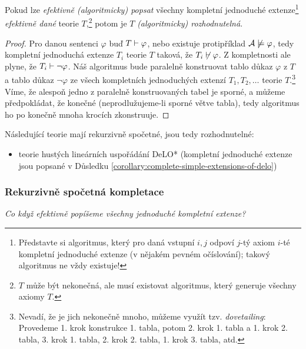 \begin{proposition}\label{propositon:efficient-complete-simple}    
    Pokud lze \emph{efektivně (algoritmicky) popsat} všechny kompletní jednoduché extenze\footnote{Představte si algoritmus, který pro daná vstupní $i,j$ odpoví $j$-tý axiom $i$-té kompletní jednoduché extenze (v nějakém pevném očíslování); takový algoritmus ne vždy existuje!} \emph{efektivně dané} teorie $T$,\footnote{$T$ může být nekonečná, ale musí existovat algoritmus, který generuje všechny axiomy $T$.} potom je $T$ \emph{(algoritmicky) rozhodnutelná}.
\end{proposition}
\begin{proof}
Pro danou sentenci $\varphi$ buď $T\vdash\varphi$, nebo existuje protipříklad $\mathcal{A}\not\models\varphi$, tedy kompletní jednoduchá extenze $T_i$ teorie $T$ taková, že $T_i\not\vdash\varphi$. Z kompletnosti ale plyne, že $T_i\vdash\neg\varphi$. Náš algoritmus bude paralelně konstruovat tablo důkaz $\varphi$ z $T$ a tablo důkaz $\neg\varphi$ ze všech kompletních jednoduchých extenzí $T_1,T_2,\dots$ teorie $T$.\footnote{Nevadí, že je jich nekonečně mnoho, můžeme využít tzv. \emph{dovetailing}: Provedeme 1. krok konstrukce 1. tabla, potom 2. krok 1. tabla a 1. krok 2. tabla, 3. krok 1. tabla, 2. krok 2. tabla, 1. krok 3. tabla, atd.} Víme, že alespoň jedno z paralelně konstruovaných tabel je sporné, a můžeme předpokládat, že konečné (neprodlužujeme-li sporné větve tabla), tedy algoritmus ho po konečně mnoha krocích zkonstruuje.
\end{proof}

\begin{corollary}
Následující teorie mají rekurzivně spočetné, jsou tedy rozhodnutelné:
\begin{itemize}    
    \item teorie hustých lineárních uspořádání DeLO* (kompletní jednoduché extenze jsou popsané v Důsledku \ref{corollary:complete-simple-extensions-of-delo})
\end{itemize}
\end{corollary}


    
    
    \subsubsection*{Rekurzivně spočetná kompletace}
    {\it Co když efektivně popíšeme všechny jednoduché kompletní extenze?}
    \medskip
    
